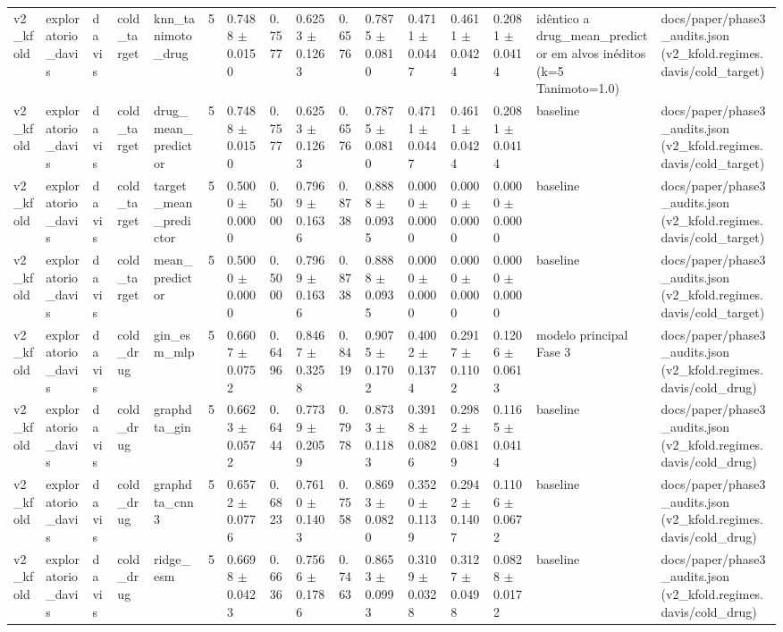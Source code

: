 \begin{table}[htbp]
\begin{tabular}{llllllllllllllll}
v2\_kfold & exploratorio\_davis & davis & cold\_target & knn\_tanimoto\_drug & 5 & 0.7488 $\pm$ 0.0150 & 0.7577 & 0.6253 $\pm$ 0.1263 & 0.6576 & 0.7875 $\pm$ 0.0810 & 0.4711 $\pm$ 0.0447 & 0.4611 $\pm$ 0.0424 & 0.2081 $\pm$ 0.0414 & idêntico a drug\_mean\_predictor em alvos inéditos (k=5 Tanimoto=1.0) & docs/paper/phase3\_audits.json (v2\_kfold.regimes.davis/cold\_target) \\
v2\_kfold & exploratorio\_davis & davis & cold\_target & drug\_mean\_predictor & 5 & 0.7488 $\pm$ 0.0150 & 0.7577 & 0.6253 $\pm$ 0.1263 & 0.6576 & 0.7875 $\pm$ 0.0810 & 0.4711 $\pm$ 0.0447 & 0.4611 $\pm$ 0.0424 & 0.2081 $\pm$ 0.0414 & baseline & docs/paper/phase3\_audits.json (v2\_kfold.regimes.davis/cold\_target) \\
v2\_kfold & exploratorio\_davis & davis & cold\_target & target\_mean\_predictor & 5 & 0.5000 $\pm$ 0.0000 & 0.5000 & 0.7969 $\pm$ 0.1636 & 0.8738 & 0.8888 $\pm$ 0.0935 & 0.0000 $\pm$ 0.0000 & 0.0000 $\pm$ 0.0000 & 0.0000 $\pm$ 0.0000 & baseline & docs/paper/phase3\_audits.json (v2\_kfold.regimes.davis/cold\_target) \\
v2\_kfold & exploratorio\_davis & davis & cold\_target & mean\_predictor & 5 & 0.5000 $\pm$ 0.0000 & 0.5000 & 0.7969 $\pm$ 0.1636 & 0.8738 & 0.8888 $\pm$ 0.0935 & 0.0000 $\pm$ 0.0000 & 0.0000 $\pm$ 0.0000 & 0.0000 $\pm$ 0.0000 & baseline & docs/paper/phase3\_audits.json (v2\_kfold.regimes.davis/cold\_target) \\
v2\_kfold & exploratorio\_davis & davis & cold\_drug & gin\_esm\_mlp & 5 & 0.6607 $\pm$ 0.0752 & 0.6496 & 0.8467 $\pm$ 0.3258 & 0.8419 & 0.9075 $\pm$ 0.1702 & 0.4002 $\pm$ 0.1374 & 0.2917 $\pm$ 0.1102 & 0.1206 $\pm$ 0.0613 & modelo principal Fase 3 & docs/paper/phase3\_audits.json (v2\_kfold.regimes.davis/cold\_drug) \\
v2\_kfold & exploratorio\_davis & davis & cold\_drug & graphdta\_gin & 5 & 0.6623 $\pm$ 0.0572 & 0.6444 & 0.7739 $\pm$ 0.2059 & 0.7978 & 0.8733 $\pm$ 0.1183 & 0.3918 $\pm$ 0.0826 & 0.2982 $\pm$ 0.0819 & 0.1165 $\pm$ 0.0414 & baseline & docs/paper/phase3\_audits.json (v2\_kfold.regimes.davis/cold\_drug) \\
v2\_kfold & exploratorio\_davis & davis & cold\_drug & graphdta\_cnn3 & 5 & 0.6572 $\pm$ 0.0776 & 0.6823 & 0.7610 $\pm$ 0.1403 & 0.7558 & 0.8693 $\pm$ 0.0820 & 0.3520 $\pm$ 0.1139 & 0.2942 $\pm$ 0.1407 & 0.1106 $\pm$ 0.0672 & baseline & docs/paper/phase3\_audits.json (v2\_kfold.regimes.davis/cold\_drug) \\
v2\_kfold & exploratorio\_davis & davis & cold\_drug & ridge\_esm & 5 & 0.6698 $\pm$ 0.0423 & 0.6636 & 0.7566 $\pm$ 0.1786 & 0.7463 & 0.8653 $\pm$ 0.0993 & 0.3109 $\pm$ 0.0328 & 0.3127 $\pm$ 0.0498 & 0.0828 $\pm$ 0.0172 & baseline & docs/paper/phase3\_audits.json (v2\_kfold.regimes.davis/cold\_drug) \\

\end{tabular}
\end{table}
